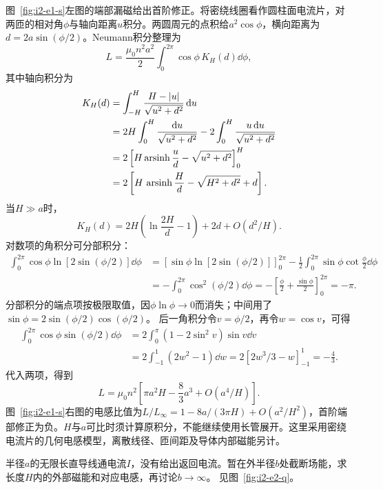 \begin{solution}
图~\ref{fig:i2-e1-s}左图的端部漏磁给出首阶修正。将密绕线圈看作圆柱面电流片，对两匝的相对角$\phi$与轴向距离$u$积分。两圆周元的点积给$a^2\cos\phi$，横向距离为$d=2a\sin(\phi/2)$。Neumann积分整理为
\[L=\frac{\mu_0n^2a^2}{2}\int_0^{2\pi}\cos\phi\,K_H(d)\dd\phi,
\]
其中轴向积分为
\[\begin{aligned}
K_H(d)&=\int_{-H}^H\frac{H-|u|}{\sqrt{u^2+d^2}}\mathop{}\!\mathrm d u\\
&=2H\int_0^H\frac{\mathop{}\!\mathrm d u}{\sqrt{u^2+d^2}}
-2\int_0^H\frac{u\mathop{}\!\mathrm d u}{\sqrt{u^2+d^2}}\\
&=2\left[H\operatorname{arsinh}\frac ud-\sqrt{u^2+d^2}\right]_0^H\\
&=2\left[H\,\operatorname{arsinh}\frac Hd-\sqrt{H^2+d^2}+d\right].
\end{aligned}\]
当$H\gg a$时，
\[K_H(d)=2H\left(\ln\frac{2H}{d}-1\right)+2d+O(d^2/H).
\]
对数项的角积分可分部积分：
\[\begin{aligned}
\int_0^{2\pi}\cos\phi\ln[2\sin(\phi/2)]\dd\phi
&=\left[\sin\phi\ln[2\sin(\phi/2)]\right]_0^{2\pi}
-\frac12\int_0^{2\pi}\sin\phi\cot\frac\phi2\dd\phi\\
&=-\int_0^{2\pi}\cos^2(\phi/2)\dd\phi
=-\left[\frac\phi2+\frac{\sin\phi}{2}\right]_0^{2\pi}=-\pi.
\end{aligned}\]
分部积分的端点项按极限取值，因$\phi\ln\phi\to0$而消失；中间用了$\sin\phi=2\sin(\phi/2)\cos(\phi/2)$。
后一角积分令$v=\phi/2$，再令$w=\cos v$，可得
\[\begin{aligned}
\int_0^{2\pi}\cos\phi\sin(\phi/2)\dd\phi
&=2\int_0^\pi(1-2\sin^2v)\sin v\dd v\\
&=2\int_{-1}^1(2w^2-1)\dd w
=2[2w^3/3-w]_{-1}^1=-\frac43.
\end{aligned}\]
代入两项，得到
\[\boxed{L=\mu_0n^2\left[\pi a^2H-\frac83a^3
+O(a^4/H)\right]}.
\]
图~\ref{fig:i2-e1-s}右图的电感比值为$L/L_\infty=1-8a/(3\pi H)+O(a^2/H^2)$，首阶端部修正为负。$H$与$a$可比时须计算原积分，不能继续使用长管展开。这里采用密绕电流片的几何电感模型，离散线径、匝间距及导体内部磁能另计。
\end{solution}

\begin{example}[为什么无限单根导线没有有限自感]\label{ex:i2-e2}
半径$a$的无限长直导线通电流$I$，没有给出返回电流。暂在外半径$b$处截断场能，求长度$H$内的外部磁能和对应电感，再讨论$b\to\infty$。 见图~\ref{fig:i2-e2-q}。
\end{example}

